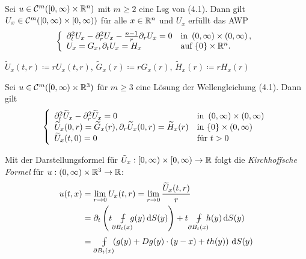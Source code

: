 \documentclass{cheat-sheet}
\def\Xint#1{\mathchoice
   {\XXint\displaystyle\textstyle{#1}}%
   {\XXint\textstyle\scriptstyle{#1}}%
   {\XXint\scriptstyle\scriptscriptstyle{#1}}%
   {\XXint\scriptscriptstyle\scriptscriptstyle{#1}}%
   \!\int}
\def\XXint#1#2#3{{\setbox0=\hbox{$#1{#2#3}{\int}$}
     \vcenter{\hbox{$#2#3$}}\kern-.5\wd0}}
\def\dashint{\Xint-}
\newcommand{\mymvint}[2]{{\textstyle \dashint\limits_{#1}^{#2}}}
\newcommand{\MVInt}[4]{\mymvint{#1}{#2} #3 \,\d #4}
\begin{document}
\begin{lem}\mbox{}\\
  Sei $u \in \mathcal{C}^m(\left[ 0, \infty \right) \times \mathbb{R}^n)$ mit $m \geq 2$ eine Lsg von (4.1). Dann gilt $U_x \in \mathcal{C}^m(\left[ 0, \infty \right) \times \left[ 0, \infty \right))$ für alle $x \in \mathbb{R}^n$ und $U_x$ erfüllt das AWP
  \[
    \left\{ \begin{array}{ll}
      \partial_t^2 U_x - \partial_r^2 U_x - \tfrac{n-1}{r} \partial_r U_x = 0 & \text{in } \left( 0, \infty \right) \times \left( 0, \infty \right),\\
      U_x = G_x, \partial_t U_x = H_x & \text{auf } \{ 0 \} \times \mathbb{R}^n.
    \end{array} \right.
  \]
\end{lem}



\begin{nota}
  $\widetilde{U}_x(t, r) \coloneqq r U_x(t, r)$, $\widetilde{G}_x(r) \coloneqq r G_x(r)$, $\widetilde{H}_x(r) \coloneqq r H_x(r)$
\end{nota}

\begin{lem}
  Sei $u \in \mathcal{C}^m(\left[ 0, \infty \right) \times \mathbb{R}^3)$ für $m \geq 3$ eine Lösung der Wellengleichung (4.1). Dann gilt
  \[
    \left\{ \begin{array}{ll}
      \partial_t^2 \widetilde{U}_x - \partial_r^2 \widetilde{U}_x = 0 & \text{in } \left( 0, \infty \right) \times \left( 0, \infty \right) \\
      \widetilde{U}_x(0, r) = \widetilde{G}_x(r), \partial_r \widetilde{U}_x(0, r) = \widetilde{H}_x(r) & \text{in } \{ 0 \} \times \left( 0, \infty \right) \\
      \widetilde{U}_x(t, 0) = 0 & \text{für } t > 0
    \end{array} \right.
  \]
\end{lem}

\begin{bem}
  Mit der Darstellungsformel für $\tilde{U}_x : \left[ 0, \infty \right) \times \left[ 0, \infty \right) \to \mathbb{R}$ folgt die \emph{Kirchhoffsche Formel} für $u : \left( 0, \infty \right) \times \mathbb{R}^3 \to \mathbb{R}$:
  \begin{align*}
    u(t, x) &= \lim_{r \to 0} U_x(t, r) = \lim_{r \to 0} \frac{\widetilde{U}_x(t, r)}{r} \\
    &= \partial_t \left( t \quad \MVInt{\mathclap{\partial B_t(x)}}{}{\enspace g(y)}{S(y)} \right) + t \quad \MVInt{\mathclap{\partial B_t(x)}}{}{\enspace h(y)}{S(y)} \\
    &= \quad \MVInt{\mathclap{\partial B_t(x)}}{}{\enspace \left( g(y) + D g(y) \cdot (y-x) + t h(y) \right)}{S(y)}
  \end{align*}
\end{bem}
\end{document}
